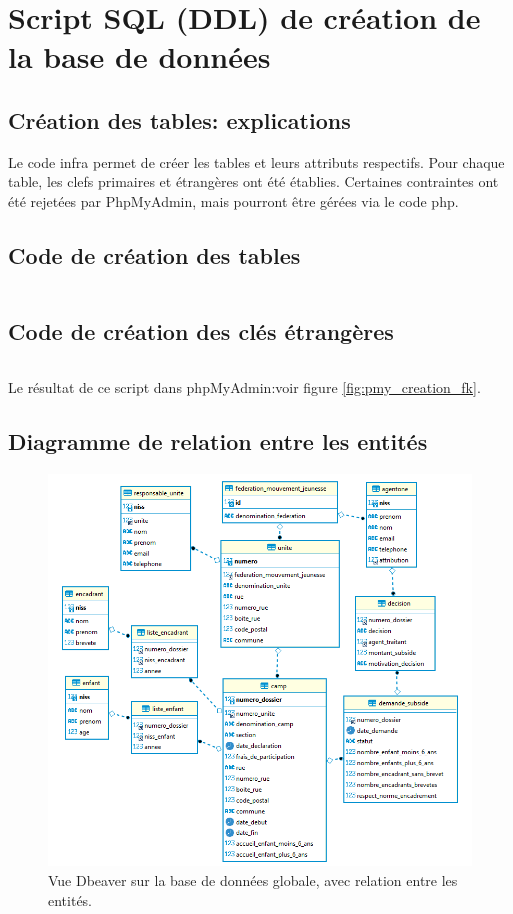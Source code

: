 \section{Script SQL (DDL) de création de la base de données}
\subsection{Création des tables: explications}
Le code infra permet de créer les tables et leurs attributs respectifs. Pour chaque table, les clefs primaires et étrangères ont été établies. Certaines contraintes ont été rejetées par PhpMyAdmin, mais pourront être gérées via le code php.

\subsection{Code de création des tables}
\inputminted[breaklines =true, autogobble, linenos, frame = single]{sql}{Codes/code_creation.tex}

\subsection{Code de création des clés étrangères}
\inputminted[breaklines =true, autogobble, linenos, frame = single]{sql}{Codes/code_key.tex}

Le résultat de ce script dans phpMyAdmin:voir figure \ref{fig:pmy_creation_fk}.

\subsection{Diagramme de relation entre les entités}
\begin{figure}[H]
    \centering
    \includegraphics[width=17cm]{Pictures/er_diagram.png}
    \caption{Vue Dbeaver sur la base de données globale, avec relation entre les entités.}
    \label{fig:er_diagram}
\end{figure}



